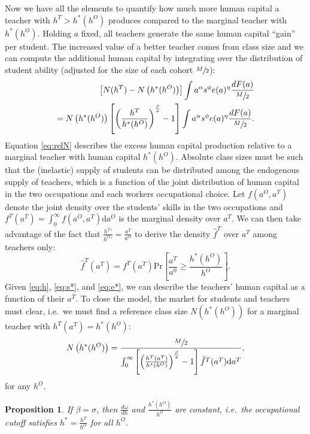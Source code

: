 \documentclass[onehalfspacing,11pt]{article}
\newtheorem{prp}{Proposition}
\begin{document}
Now we have all the elements to quantify how much more human capital a teacher with $h^T > h^*(h^O)$ produces compared to the marginal teacher with $h^*(h^O)$. Holding $a$ fixed, all teachers generate the same human capital ``gain'' per student. The increased value of a better teacher comes from class size and we can compute the additional human capital by integrating over the distribution of student ability (adjusted for the size of each cohort $\sfrac{M}{2}$):
\begin{align}
\label{eq:relN}
\left[N(h^T) - N\left(h^*(h^O) \right)\right] \int a^\alpha s^\phi e(a)^\eta \frac{dF(a)}{\sfrac{M}{2}} \nonumber \\
= N\left(h^*(h^O) \right) \left[ \left(\frac{h^T}{h^*(h^O)}\right)^{\frac{\beta}{\sigma}} - 1 \right] \int a^\alpha s^\phi e(a)^\eta \frac{dF(a)}{\sfrac{M}{2}}.
\end{align}
Equation \eqref{eq:relN} describes the excess human capital production relative to a marginal teacher with human capital $h^*(h^O)$. Absolute class sizes must be such that the (inelastic) supply of students can be distributed among the endogenous supply of teachers, which is a function of the joint distribution of human capital in the two occupations and each workers occupational choice. Let $f(a^O,a^T)$ denote the joint density over the students' skills in the two occupations and $f^T(a^T) = \int_0^\infty f(a^O,a^T) \textrm{d}a^O$ is the marginal density over $a^T$. We can then take advantage of the fact that $\frac{{h^T}'}{{h^O}'} = \frac{a^T}{a^O}$ to derive the density $\hat{f}^T$ over $a^T$ among teachers only:
\begin{equation}
\label{eq:densT}
\hat{f}^T(a^T) = f^T(a^T) \textrm{Pr}\left[ \frac{a^T}{a^0} \geq \frac{h^{\ast}(h^O)}{h^O} \right].
\end{equation}
Given \eqref{eq:h}, \eqref{eq:s*}, and \eqref{eq:e*}, we can describe the teachers' human capital as a function of their $a^T$. To close the model, the market for students and teachers must clear, i.e.~we must find a reference class size $N\left(h^*(h^O) \right)$ for a marginal teacher with $h^T(a^T) = h^*(h^O)$:
\begin{equation}
\label{eq:marketclear}
N\left(h^*(h^O) \right) = \frac{\sfrac{M}{2}}{\int_0^\infty \left[ \left(\frac{h^T(a^T)}{h^*(h^O)}\right)^{\frac{\beta}{\sigma}} - 1 \right] \hat{f}^T(a^T) \textrm{d}a^T},
\end{equation}
for any $h^O$.
\begin{prp}
If $\beta = \sigma$, then $\frac{d\omega}{dh}$ and $\frac{h^*(h^O)}{h^O}$ are constant, i.e.~the occupational cutoff satisfies $h^* = \frac{h^T}{h^O}$ for all $h^O$.
\end{prp}
\end{document}
